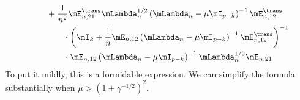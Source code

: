 \begin{align*}
\begin{split}
            &\qquad+
            \frac{1}{n^2}
            \mE_{n,21}^\trans
            \mLambda_{n}^{1/2}
            \left(
                \mLambda_n
                -
                \mu
                \mI_{p-k}
            \right)^{-1}
            \mE_{n,12}^\trans \\
            &\qquad\qquad\cdot
            \left(
                \mI_k
                +
                \frac{1}{n}
                \mE_{n,12}
                \left(
                    \mLambda_n
                    -
                    \mu
                    \mI_{p-k}
                \right)^{-1}
                \mE_{n,12}^\trans
            \right)^{-1} \\
            &\qquad\qquad\cdot
            \mE_{n,12}
            \left(
                \mLambda_n
                -
                \mu
                \mI_{p-k}
            \right)^{-1}
            \mLambda_{n}^{1/2}
            \mE_{n,21}
    \end{split}
\end{align*}
To put it mildly, this is a formidable expression.  We can simplify the formula substantially when $\mu > \left(1 + \gamma^{-1/2} \right)^2$.

